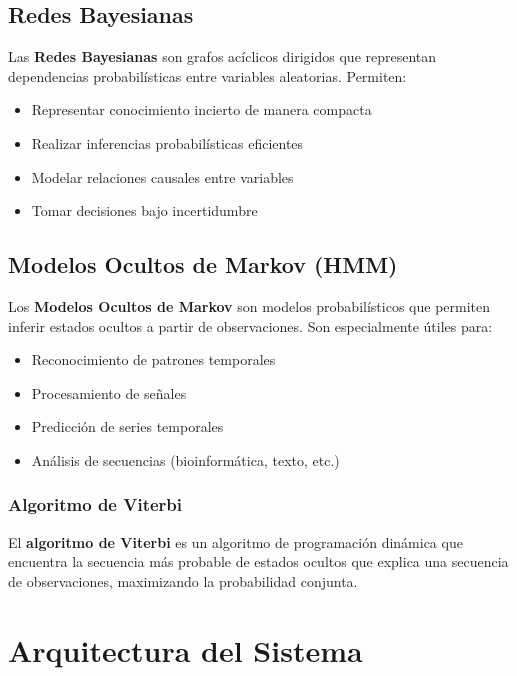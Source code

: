 \documentclass[
]{article}
\providecommand{\tightlist}{%
  \setlength{\itemsep}{0pt}\setlength{\parskip}{0pt}}
\begin{document}
\subsection{Redes Bayesianas}\label{redes-bayesianas}

Las \textbf{Redes Bayesianas} son grafos acíclicos dirigidos que
representan dependencias probabilísticas entre variables aleatorias.
Permiten:

\begin{itemize}
\tightlist
\item
  Representar conocimiento incierto de manera compacta
\item
  Realizar inferencias probabilísticas eficientes
\item
  Modelar relaciones causales entre variables
\item
  Tomar decisiones bajo incertidumbre
\end{itemize}

\subsection{Modelos Ocultos de Markov
(HMM)}\label{modelos-ocultos-de-markov-hmm}

Los \textbf{Modelos Ocultos de Markov} son modelos probabilísticos que
permiten inferir estados ocultos a partir de observaciones. Son
especialmente útiles para:

\begin{itemize}
\tightlist
\item
  Reconocimiento de patrones temporales
\item
  Procesamiento de señales
\item
  Predicción de series temporales
\item
  Análisis de secuencias (bioinformática, texto, etc.)
\end{itemize}

\subsubsection{Algoritmo de Viterbi}\label{algoritmo-de-viterbi}

El \textbf{algoritmo de Viterbi} es un algoritmo de programación
dinámica que encuentra la secuencia más probable de estados ocultos que
explica una secuencia de observaciones, maximizando la probabilidad
conjunta.

\section{Arquitectura del Sistema}\label{arquitectura-del-sistema}
\end{document}
